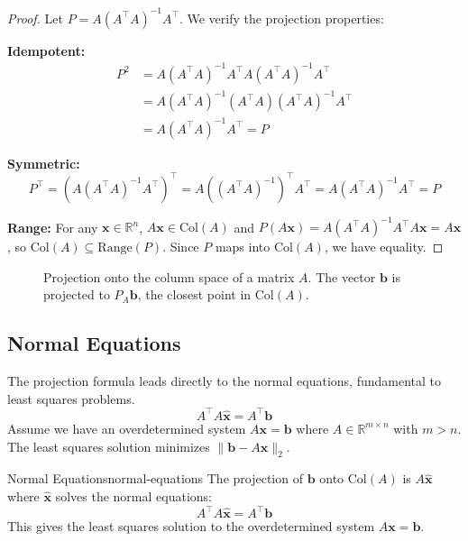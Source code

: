\begin{proof}
    Let $P = A(A^{\top} A)^{-1} A^{\top}$. We verify the projection properties:

    \textbf{Idempotent:}
    \begin{align}
        P^2 & = A(A^{\top} A)^{-1} A^{\top} A(A^{\top} A)^{-1} A^{\top}   \\
            & = A(A^{\top} A)^{-1} (A^{\top} A)(A^{\top} A)^{-1} A^{\top} \\
            & = A(A^{\top} A)^{-1} A^{\top} = P
    \end{align}

    \textbf{Symmetric:}
    \[
        P^{\top} = (A(A^{\top} A)^{-1} A^{\top})^{\top} = A((A^{\top} A)^{-1})^{\top} A^{\top} = A(A^{\top} A)^{-1} A^{\top} = P
    \]

    \textbf{Range:} For any $\mathbf{x}  \in  \mathbb{R}^n$, $A\mathbf{x}  \in  \text{Col}(A)$ and $P(A\mathbf{x}) = A(A^{\top} A)^{-1} A^{\top} A\mathbf{x} = A\mathbf{x}$, so $\text{Col}(A) \subseteq \text{Range}(P)$. Since $P$ maps into $\text{Col}(A)$, we have equality.
\end{proof}

\begin{figure}[htb]
    \centering
     
    \caption{Projection onto the column space of a matrix $A$. The vector $\mathbf{b}$ is projected to $P_A \mathbf{b}$, the closest point in $\text{Col}(A)$.}
    \label{fig:column-projection}
\end{figure}

\subsection{Normal Equations}

The projection formula leads directly to the normal equations, fundamental to least squares problems.
\begin{equation}
    A^{\top} A \hat{\mathbf{x}} = A^{\top} \mathbf{b}
\end{equation}
Assume we have an overdetermined system $A\mathbf{x} = \mathbf{b}$ where $A  \in  \mathbb{R}^{m \times n}$ with $m > n$. The least squares solution minimizes $\|\mathbf{b} - A\mathbf{x}\|_2$.

\begin{corollary}{Normal Equations}{normal-equations}
    The projection of $\mathbf{b}$ onto $\text{Col}(A)$ is $A\hat{\mathbf{x}}$ where $\hat{\mathbf{x}}$ solves the normal equations:
    \[
        A^{\top} A \hat{\mathbf{x}} = A^{\top} \mathbf{b}
    \]
    This gives the least squares solution to the overdetermined system $A\mathbf{x} = \mathbf{b}$.
\end{corollary}

